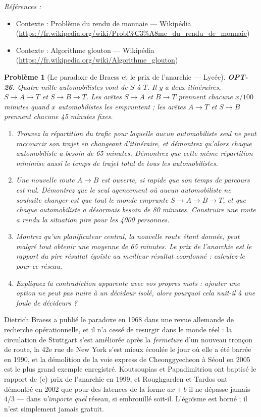 \documentclass[11pt]{article}
\newtheorem{problem}{Problème}
\newenvironment{refs}{\par\small\noindent\emph{Références :}\begin{itemize}\setlength\itemsep{0pt}}{\end{itemize}\normalsize}
\begin{document}
\begin{refs}
\item Contexte : Problème du rendu de monnaie --- Wikipédia (\url{https://fr.wikipedia.org/wiki/Probl%C3%A8me_du_rendu_de_monnaie})
\item Contexte : Algorithme glouton --- Wikipédia (\url{https://fr.wikipedia.org/wiki/Algorithme_glouton})
\end{refs}

\bigskip

\begin{problem}[{Le paradoxe de Braess et le prix de l'anarchie --- Lycée}]
\textbf{OPT-26.} Quatre mille automobilistes vont de $S$ à $T$. Il y a deux itinéraires,
$S \to A \to T$ et $S \to B \to T$. Les arêtes $S \to A$ et $B \to T$ prennent chacune $x/100$
minutes quand $x$ automobilistes les empruntent ; les arêtes $A \to T$ et $S \to B$ prennent chacune
45 minutes fixes.
\begin{enumerate}
\item[(a)] Trouvez la répartition du trafic pour laquelle aucun automobiliste seul ne peut raccourcir son
trajet en changeant d'itinéraire, et démontrez qu'alors chaque automobiliste a besoin de 65 minutes.
Démontrez que cette même répartition minimise aussi le temps de trajet total de tous les
automobilistes.
\item[(b)] Une nouvelle route $A \to B$ est ouverte, si rapide que son temps de parcours est nul.
Démontrez que le seul agencement où aucun automobiliste ne souhaite changer est que \textit{tout le
monde} emprunte $S \to A \to B \to T$, et que chaque automobiliste a désormais besoin de 80
minutes. Construire une route a rendu la situation pire pour les 4000 personnes.
\item[(c)] Montrez qu'un planificateur central, la nouvelle route étant donnée, peut malgré tout obtenir
une moyenne de 65 minutes. Le \textit{prix de l'anarchie} est le rapport du pire résultat égoïste au
meilleur résultat coordonné : calculez-le pour ce réseau.
\item[(d)] Expliquez la contradiction apparente avec vos propres mots : ajouter une option ne peut pas
nuire à un décideur isolé, alors pourquoi cela nuit-il à une foule de décideurs ?
\end{enumerate}

\end{problem}

\noindent Dietrich Braess a publié le paradoxe en 1968 dans une revue allemande de recherche
opérationnelle, et il n'a cessé de resurgir dans le monde réel : la circulation de Stuttgart s'est
améliorée après la \textit{fermeture} d'un nouveau tronçon de route, la 42e rue de New York
s'est mieux écoulée le jour où elle a été barrée en 1990, et la démolition de la voie express de
Cheonggyecheon à Séoul en 2005 est le plus grand exemple enregistré. Koutsoupias et Papadimitriou
ont baptisé le rapport de (c) prix de l'anarchie en 1999, et Roughgarden et Tardos ont démontré en
2002 que pour des latences de la forme $ax + b$ il ne dépasse jamais $4/3$ --- dans \textit{n'importe
quel} réseau, si embrouillé soit-il. L'égoïsme est borné ; il n'est simplement jamais
gratuit.
\end{document}
